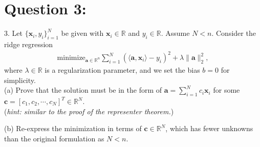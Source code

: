 \documentclass[a4paper,12pt]{article}
\newcommand{\R}{\mathbb{R}}
\begin{document}
\section*{Question 3:}
3. Let \(\{\bm{x}_i, y_i\}_{i = 1}^N\) be given with \(\bm{x}_i \in \R\) and \(y_i \in \R\). Assume \(N < n\). Consider the ridge regression \begin{align*}
    \text{minimize}_{\bm{a}\in\R^n} \sum_{i = 1}^N (\langle \bm{a}, \bm{x}_i\rangle - y_i)^2 + \lambda\|\bm{a}\|_2^2,
\end{align*}
where \(\lambda \in \R\) is a regularization parameter, and we set the bias \(b = 0\) for simplicity. \\

(a) Prove that the solution must be in the form of \(\bm{a} = \sum_{i = 1}^N c_i \bm{x}_i\) for some \(\bm{c} = [c_1, c_2, \cdots, c_N]^T \in \R^N\). \\
(\textit{hint: similar to the proof of the representer theorem.})

(b) Re-express the minimization in terms of \(\bm{c} \in \R^N\), which has fewer unknowns than the original formulation as \(N < n\).
\end{document}
